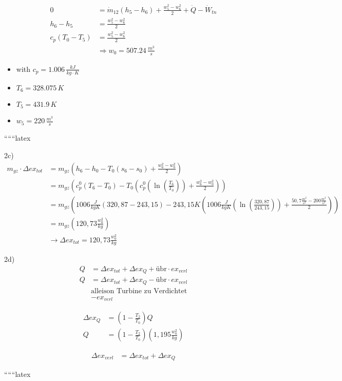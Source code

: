 \begin{align*}
    0 &= \dot{m}_{12} (h_5 - h_6) + \frac{w_5^2 - w_6^2}{2} + \dot{Q} - \dot{W}_{tn} \\
    h_6 - h_5 &= \frac{w_5^2 - w_6^2}{2} \\
    c_p (T_0 - T_5) &= \frac{w_5^2 - w_6^2}{2} \\
    &\Rightarrow w_0 = 507.24 \, \frac{m^3}{s}
\end{align*}

\begin{itemize}
    \item with $c_p = 1.006 \, \frac{kJ}{kg \cdot K}$
    \item $T_6 = 328.075 \, K$
    \item $T_5 = 431.9 \, K$
    \item $w_5 = 220 \, \frac{m^3}{s}$
\end{itemize}

``````latex


2c) 
\begin{align*}
m_{gz} \cdot \Delta ex_{tot} &= m_{gz} \left( h_6 - h_0 - T_0 \left( s_6 - s_0 \right) + \frac{w_6^2 - w_0^2}{2} \right) \\
&= m_{gz} \left( c_p^0 \left( T_6 - T_0 \right) - T_0 \left( c_p^0 \left( \ln \left( \frac{T_6}{T_0} \right) \right) + \frac{w_6^2 - w_0^2}{2} \right) \right) \\
&= m_{gz} \left( 1006 \frac{J}{kgK} \left( 320,87 - 243,15 \right) - 243,15 K \left( 1006 \frac{J}{kgK} \left( \ln \left( \frac{320,87}{243,15} \right) \right) + \frac{50,7 \frac{m^2}{s^2} - 200 \frac{m^2}{s^2}}{2} \right) \right) \\
&= m_{gz} \left( 120,73 \frac{w_0^2}{kg} \right) \\
&\rightarrow \Delta ex_{tot} = 120,73 \frac{w_0^2}{kg}
\end{align*}

2d) 
\begin{align*}
Q &= \Delta ex_{tot} + \Delta ex_Q + \text{übr} \cdot ex_{verl} \\
Q &= \Delta ex_{tot} + \Delta ex_Q - \text{übr} \cdot ex_{verl} \\
&\text{alleison Turbine zu Verdichtet} \\
&- ex_{verl}
\end{align*}

\begin{align*}
\Delta ex_Q &= \left( 1 - \frac{T_2}{T_0} \right) Q \\
Q &= \left( 1 - \frac{T_2}{T_0} \right) \left( 1,195 \frac{w_0^2}{kg} \right)
\end{align*}

\begin{align*}
\Delta ex_{verl} &= \Delta ex_{tot} + \Delta ex_Q
\end{align*}

``````latex


